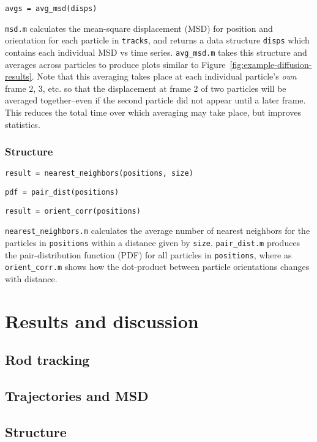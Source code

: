 \texttt{avgs = avg\_msd(disps)}

\texttt{msd.m} calculates the mean-square displacement (MSD) for position and orientation for each particle 
in \texttt{tracks}, and returns a data structure \texttt{disps} which contains each individual MSD vs time 
series.  \texttt{avg\_msd.m} takes this structure and averages across particles to produce plots similar 
to Figure~\ref{fig:example-diffusion-results}. Note that this averaging takes place at each 
individual particle's \textit{own} frame 2, 3, etc. so that the displacement at frame 2 of two particles 
will be averaged together--even if the second particle did not appear until a later frame.  This reduces the
total time over which averaging may take place, but improves statistics.

\subsubsection{Structure}
\label{sec:structure-calcs}

\texttt{result = nearest\_neighbors(positions, size)}

\texttt{pdf = pair\_dist(positions)}

\texttt{result = orient\_corr(positions)}

\texttt{nearest\_neighbors.m} calculates the average number of nearest neighbors for the particles in 
\texttt{positions} within a distance given by \texttt{size}. \texttt{pair\_dist.m} produces the pair-distribution
function (PDF) for all particles in \texttt{positions}, where as \texttt{orient\_corr.m} shows how the 
dot-product between particle orientations changes with distance.

\section{Results and discussion}

\subsection{Rod tracking}

\subsection{Trajectories and MSD}

\subsection{Structure}
